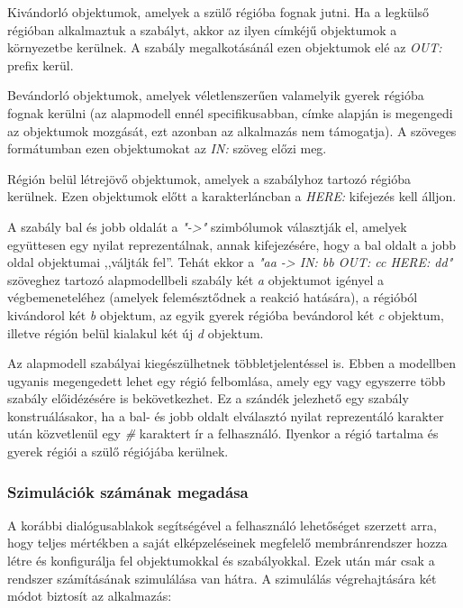 \begin{compactenum}
	\item Kivándorló objektumok, amelyek a szülő régióba fognak jutni. Ha a legkülső régióban alkalmaztuk a szabályt, akkor az ilyen címkéjű objektumok a környezetbe kerülnek. A szabály megalkotásánál ezen objektumok elé az \textit{OUT:} prefix kerül.
	\item Bevándorló objektumok, amelyek véletlenszerűen valamelyik gyerek régióba fognak kerülni (az alapmodell ennél specifikusabban, címke alapján is megengedi az objektumok mozgását, ezt azonban az alkalmazás nem támogatja). A szöveges formátumban ezen objektumokat az \textit{IN:} szöveg előzi meg.
	\item Régión belül létrejövő objektumok, amelyek a szabályhoz tartozó régióba kerülnek. Ezen objektumok előtt a karakterláncban a \textit{HERE:} kifejezés kell álljon.
\end{compactenum}
A szabály bal és jobb oldalát a \textit{"->"} szimbólumok választják el, amelyek együttesen egy nyilat reprezentálnak, annak kifejezésére, hogy a bal oldalt a jobb oldal objektumai ,,váljták fel''.
Tehát ekkor a \textit{"aa -> IN: bb OUT: cc HERE: dd"} szöveghez tartozó alapmodellbeli szabály két \textit{a} objektumot igényel a végbemeneteléhez (amelyek felemésztődnek a reakció hatására), a régióból kivándorol két \textit{b} objektum, az egyik gyerek régióba bevándorol két \textit{c} objektum, illetve régión belül kialakul két új \textit{d} objektum.

Az alapmodell szabályai kiegészülhetnek többletjelentéssel is. Ebben a modellben ugyanis megengedett lehet egy régió felbomlása, amely egy vagy egyszerre több szabály előidézésére is bekövetkezhet. Ez a szándék jelezhető egy szabály konstruálásakor, ha a bal- és jobb oldalt elválasztó nyilat reprezentáló karakter után közvetlenül egy \textit{\#} karaktert ír a felhasználó. Ilyenkor a régió tartalma és gyerek régiói a szülő régiójába kerülnek.


\subsubsection{Szimulációk számának megadása}

A korábbi dialógusablakok segítségével a felhasználó lehetőséget szerzett arra, hogy teljes mértékben a saját elképzeléseinek megfelelő membránrendszer hozza létre és konfigurálja fel objektumokkal és szabályokkal. Ezek után már csak a rendszer számításának szimulálása van hátra. A szimulálás végrehajtására két módot biztosít az alkalmazás:

